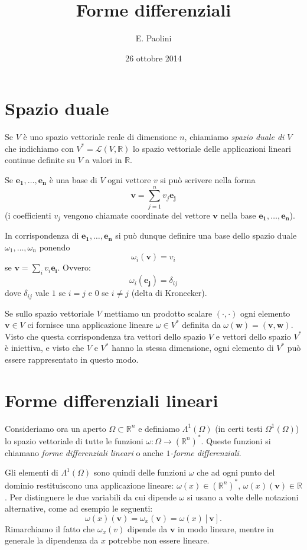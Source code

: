 \documentclass[italian,a4paper]{scrartcl}
\title{Forme differenziali}
\author{E. Paolini}
\date{26 ottobre 2014}
\newcommand{\RR}{{\mathbb R}}
\newcommand{\defeq}{=}
\renewcommand{\vec}{\mathbf}
\begin{document}
\maketitle

\section{Spazio duale}

Se $V$ è uno spazio vettoriale reale di dimensione $n$, chiamiamo
\emph{spazio duale di $V$} che indichiamo con $V^* =
\mathcal L (V,\RR)$ lo spazio vettoriale delle applicazioni lineari
continue definite su $V$ a valori in $\RR$.

Se $\vec{e_1},\dots, \vec{e_n}$ è una base di $V$ ogni vettore $v$ si può scrivere
nella forma
\[
  \vec v = \sum_{j=1}^n v_j \vec {e_j}
\]
(i coefficienti $v_j$ vengono chiamate coordinate del vettore $\vec v$
nella base $\vec{e_1},\dots, \vec{e_n}$).

In corrispondenza di $\vec{e_1},\dots, \vec{e_n}$ si può dunque definire una base
dello spazio duale $\omega_1,\dots,\omega_n$ ponendo
\[
  \omega_i (\vec v) \defeq v_i
\]
se $\vec v = \sum_i v_i \vec{e_i}$.
Ovvero:
\[
  \omega_i(\vec{e_j}) = \delta_{ij}
\]
dove $\delta_{ij}$ vale $1$ se $i=j$ e $0$ se $i\neq j$ (delta di
Kronecker).

Se sullo spazio vettoriale $V$ mettiamo un prodotto scalare $(\cdot
,\cdot)$ ogni elemento $\vec v\in V$ ci fornisce una applicazione lineare
$\omega \in V^*$ definita da $\omega(\vec w) = (\vec v,\vec w)$. Visto che questa
corrispondenza tra vettori dello spazio $V$ e vettori dello spazio
$V^*$ è iniettiva, e visto che $V$ e $V^*$ hanno la stessa dimensione,
ogni elemento di $V^*$ può essere rappresentato in questo modo.

\section{Forme differenziali lineari}

Consideriamo ora un aperto $\Omega\subset \RR^n$ e definiamo
$\Lambda^1(\Omega)$ (in certi testi $\Omega^1(\Omega)$) lo spazio
vettoriale di tutte le funzioni $\omega\colon \Omega \to (\RR^n)^*$. 
Queste funzioni si chiamano \emph{forme differenziali lineari} o 
anche \emph{$1$-forme differenziali}.

Gli elementi di $\Lambda^1(\Omega)$ sono quindi delle funzioni
$\omega$ che ad
ogni punto del dominio restituiscono una applicazione lineare:
$\omega(x) \in (\RR^n)^*$, $\omega(x)(\vec v) \in \RR$. Per distinguere le
due variabili da cui dipende $\omega$ si usano a volte delle notazioni
alternative, come ad esempio le seguenti:
\[
\omega(x)(\vec v) = \omega_x(\vec v) = \omega(x)[\vec v].
\]
Rimarchiamo il fatto che $\omega_x(v)$ dipende da $\vec v$ in modo
lineare, mentre in generale la dipendenza da $x$ potrebbe non essere lineare.
\end{document}
